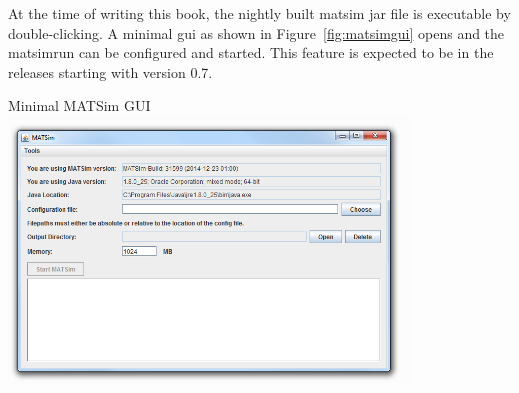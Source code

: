 

At the time of writing this book, the nightly built \gls{matsim} \gls{jar} file is executable by double-clicking. A minimal \gls{gui} as shown in Figure~\ref{fig:matsimgui} opens and the \gls{matsimrun} can be configured and started. 
This feature is expected to be in the releases starting with version 0.7.

%
{Minimal MATSim GUI}%
{\label{fig:matsimgui}}%
{\includegraphics[width=0.8\textwidth, angle=0]{using/figures/matsimgui.png}}%
{}

